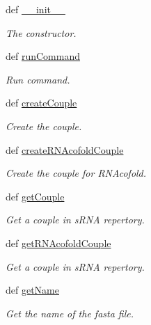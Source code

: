 \begin{DoxyCompactItemize}
\item 
def \hyperlink{classirna_1_1iRNA__pred_1_1Comparison_1_1Comparaison_a8d60092f239a1ebc4219c1eb8738387c}{\-\_\-\-\_\-init\-\_\-\-\_\-}
\begin{DoxyCompactList}\small\item\em \-The constructor. \end{DoxyCompactList}\item 
def \hyperlink{classirna_1_1iRNA__pred_1_1Comparison_1_1Comparaison_a704d7dc6ef4883a76f54ce2a48f72a02}{run\-Command}
\begin{DoxyCompactList}\small\item\em \-Run command. \end{DoxyCompactList}\item 
def \hyperlink{classirna_1_1iRNA__pred_1_1Comparison_1_1Comparaison_a5401c772ffbdbd502109416c1891791a}{create\-Couple}
\begin{DoxyCompactList}\small\item\em \-Create the couple. \end{DoxyCompactList}\item 
def \hyperlink{classirna_1_1iRNA__pred_1_1Comparison_1_1Comparaison_a9010989145b0313ce604b4cb7814ea3f}{create\-R\-N\-Acofold\-Couple}
\begin{DoxyCompactList}\small\item\em \-Create the couple for \-R\-N\-Acofold. \end{DoxyCompactList}\item 
def \hyperlink{classirna_1_1iRNA__pred_1_1Comparison_1_1Comparaison_aa5f60ad39dc7abab1f8ea544e62b593e}{get\-Couple}
\begin{DoxyCompactList}\small\item\em \-Get a couple in s\-R\-N\-A repertory. \end{DoxyCompactList}\item 
def \hyperlink{classirna_1_1iRNA__pred_1_1Comparison_1_1Comparaison_af43fa97f1f9d56901f0197a42a825b38}{get\-R\-N\-Acofold\-Couple}
\begin{DoxyCompactList}\small\item\em \-Get a couple in s\-R\-N\-A repertory. \end{DoxyCompactList}\item 
def \hyperlink{classirna_1_1iRNA__pred_1_1Comparison_1_1Comparaison_a72bcd3b812ba30d3d3034665f152aa15}{get\-Name}
\begin{DoxyCompactList}\small\item\em \-Get the name of the fasta file. \end{DoxyCompactList}\item 

\end{DoxyCompactItemize}
